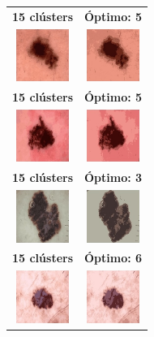 \begin{figure}[h] 
\begin{tabular}{cc}
    \textbf{15 clústers} & \textbf{Óptimo: 5} \\
    \includegraphics[width=1.7cm]{images/F19-A.jpg} &
    \includegraphics[width=1.7cm]{images/F19-B.jpg} \\
    \textbf{15 clústers} & \textbf{Óptimo: 5} \\
    \includegraphics[width=1.7cm]{images/F19-C.jpg} & 
    \includegraphics[width=1.7cm]{images/F19-D.jpg} \\
	\textbf{15 clústers} & \textbf{Óptimo: 3} \\
    \includegraphics[width=1.7cm]{images/F19-E.jpg} &
    \includegraphics[width=1.7cm]{images/F19-F.jpg} \\
	\textbf{15 clústers} & \textbf{Óptimo: 6} \\
    \includegraphics[width=1.7cm]{images/F19-G.jpg} & 
    \includegraphics[width=1.7cm]{images/F19-H.jpg} \\

\end{tabular}
\end{figure}
